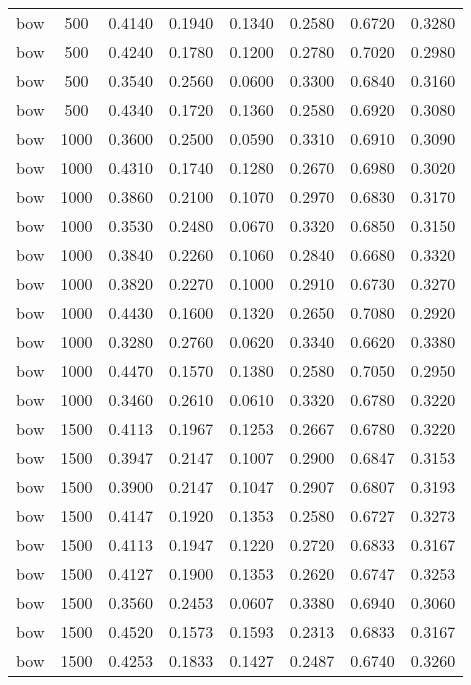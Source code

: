 \begin{scriptsize}
\begin{longtable}{cccccccc}
	bow      & 500  & 0.4140 & 0.1940 & 0.1340 & 0.2580 & 0.6720 & 0.3280 \\
	bow      & 500  & 0.4240 & 0.1780 & 0.1200 & 0.2780 & 0.7020 & 0.2980 \\
	bow      & 500  & 0.3540 & 0.2560 & 0.0600 & 0.3300 & 0.6840 & 0.3160 \\
	bow      & 500  & 0.4340 & 0.1720 & 0.1360 & 0.2580 & 0.6920 & 0.3080 \\
	bow      & 1000 & 0.3600 & 0.2500 & 0.0590 & 0.3310 & 0.6910 & 0.3090 \\
	bow      & 1000 & 0.4310 & 0.1740 & 0.1280 & 0.2670 & 0.6980 & 0.3020 \\
	bow      & 1000 & 0.3860 & 0.2100 & 0.1070 & 0.2970 & 0.6830 & 0.3170 \\
	bow      & 1000 & 0.3530 & 0.2480 & 0.0670 & 0.3320 & 0.6850 & 0.3150 \\
	bow      & 1000 & 0.3840 & 0.2260 & 0.1060 & 0.2840 & 0.6680 & 0.3320 \\
	bow      & 1000 & 0.3820 & 0.2270 & 0.1000 & 0.2910 & 0.6730 & 0.3270 \\
	bow      & 1000 & 0.4430 & 0.1600 & 0.1320 & 0.2650 & 0.7080 & 0.2920 \\
	bow      & 1000 & 0.3280 & 0.2760 & 0.0620 & 0.3340 & 0.6620 & 0.3380 \\
	bow      & 1000 & 0.4470 & 0.1570 & 0.1380 & 0.2580 & 0.7050 & 0.2950 \\
	bow      & 1000 & 0.3460 & 0.2610 & 0.0610 & 0.3320 & 0.6780 & 0.3220 \\
	bow      & 1500 & 0.4113 & 0.1967 & 0.1253 & 0.2667 & 0.6780 & 0.3220 \\
	bow      & 1500 & 0.3947 & 0.2147 & 0.1007 & 0.2900 & 0.6847 & 0.3153 \\
	bow      & 1500 & 0.3900 & 0.2147 & 0.1047 & 0.2907 & 0.6807 & 0.3193 \\
	bow      & 1500 & 0.4147 & 0.1920 & 0.1353 & 0.2580 & 0.6727 & 0.3273 \\
	bow      & 1500 & 0.4113 & 0.1947 & 0.1220 & 0.2720 & 0.6833 & 0.3167 \\
	bow      & 1500 & 0.4127 & 0.1900 & 0.1353 & 0.2620 & 0.6747 & 0.3253 \\
	bow      & 1500 & 0.3560 & 0.2453 & 0.0607 & 0.3380 & 0.6940 & 0.3060 \\
	bow      & 1500 & 0.4520 & 0.1573 & 0.1593 & 0.2313 & 0.6833 & 0.3167 \\
	bow      & 1500 & 0.4253 & 0.1833 & 0.1427 & 0.2487 & 0.6740 & 0.3260 \\

\end{longtable}
\end{scriptsize}
